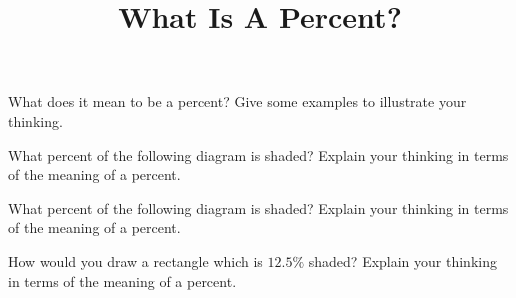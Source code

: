 \documentclass[nooutcomes,noauthor,handout]{ximera}
\title{What Is A Percent?}
\begin{document}
\begin{abstract}\end{abstract}
\maketitle

\begin{problem}
 What does it mean to be a percent? Give some examples to illustrate your thinking.
\end{problem}

\begin{problem}
What percent of the following diagram is shaded? Explain your thinking in terms of the meaning of a percent.
\begin{center}
\end{center}
\end{problem}


\begin{problem}
What percent of the following diagram is shaded? Explain your thinking in terms of the meaning of a percent.
\begin{center}
\end{center}
\end{problem}


\begin{problem}
How would you draw a rectangle which is $12.5\%$ shaded? Explain your thinking in terms of the meaning of a percent.
\end{problem}



\newpage
\end{document}
